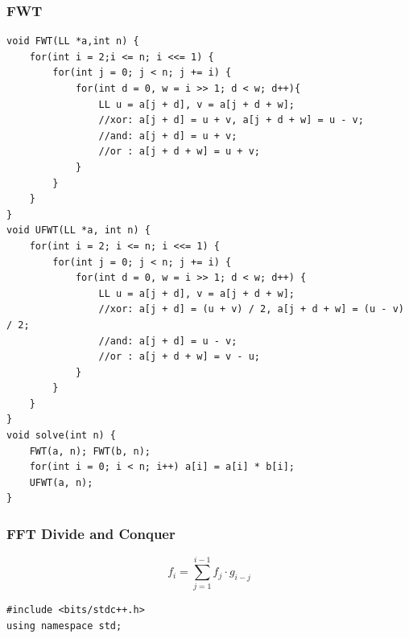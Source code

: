 \documentclass[10pt]{ctexart}
\begin{document}
{\subsubsection{FWT}
\begin{lstlisting}
void FWT(LL *a,int n) {
    for(int i = 2;i <= n; i <<= 1) {
        for(int j = 0; j < n; j += i) {
            for(int d = 0, w = i >> 1; d < w; d++){
                LL u = a[j + d], v = a[j + d + w];
                //xor: a[j + d] = u + v, a[j + d + w] = u - v;
                //and: a[j + d] = u + v;
                //or : a[j + d + w] = u + v;
            }
        }
    }
}
void UFWT(LL *a, int n) {
    for(int i = 2; i <= n; i <<= 1) {
        for(int j = 0; j < n; j += i) {
            for(int d = 0, w = i >> 1; d < w; d++) {
                LL u = a[j + d], v = a[j + d + w];
                //xor: a[j + d] = (u + v) / 2, a[j + d + w] = (u - v) / 2;
                //and: a[j + d] = u - v;
                //or : a[j + d + w] = v - u;
            }
        }
    }
}
void solve(int n) {
    FWT(a, n); FWT(b, n);
    for(int i = 0; i < n; i++) a[i] = a[i] * b[i];
    UFWT(a, n);
}
\end{lstlisting}
\subsubsection{FFT Divide and Conquer}
$$
f_i = \sum_{j=1}^{i-1} f_j \cdot g_{i-j}
$$
\begin{lstlisting}
#include <bits/stdc++.h>
using namespace std;


\end{lstlisting}}
\end{document}
